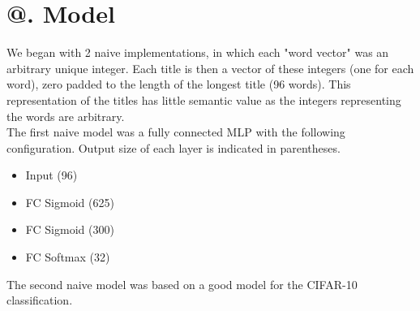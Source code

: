\documentclass[jou,apacite, 10px]{apa6}
\makeatletter
\newcommand*{\rom}[1]{\expandafter\@slowromancap\romannumeral #1@}
\makeatother
\begin{document}
\section{\rom{4}. Model}
We began with 2 naive implementations, in which each "word vector" was an arbitrary unique integer. Each title is then a vector of these integers (one for each word), zero padded to the length of the longest title (96 words). This representation of the titles has little semantic value as the integers representing the words are arbitrary.\\
The first naive model was a fully connected MLP with the following configuration. Output size of each layer is indicated in parentheses.

\begin{itemize}
    \item Input (96)
    \item FC Sigmoid (625)
    \item FC Sigmoid (300)
    \item FC Softmax (32)
\end{itemize}\rule{0pt}{4ex}
The second naive model was based on a good model for the CIFAR-10 classification.
\end{document}
